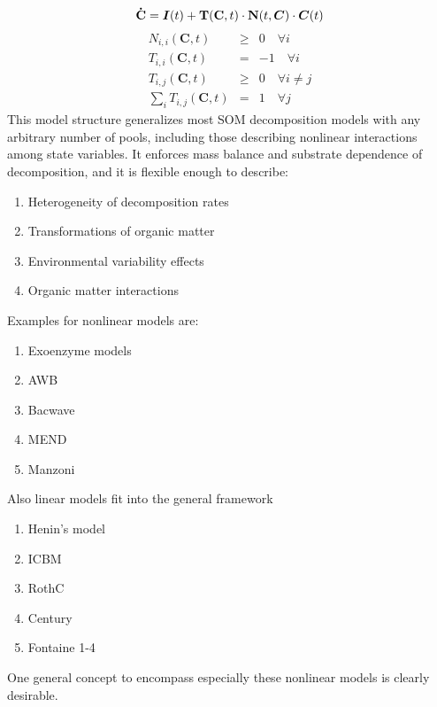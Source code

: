 
\begin{multicols}{2}
    		\[
		\mathbf{\dot{C}}= \bm{I}(t) + {\bf T}(\mathbf{C},t) \cdot {\bf N}(t, \bm{C}) \cdot \bm{C}(t)
    		\]
    		\begin{equation*}	
    		\label{structCond}
    		\begin{array}{lcl}	
    		N_{i,i}(\mathbf{C},t) 		&\ge& 	 0 \quad \forall i \\
    		T_{i,i}(\mathbf{C},t) 		&=& 	 -1 \quad \forall i \\
    		T_{i,j}(\mathbf{C},t) 		&\ge& 	 0 \quad \forall i \ne j \\
    		\sum_i T_{i,j}(\mathbf{C},t) 	&=  &	 1\quad \forall j 
    		\end{array}	
    		\end{equation*}	
    		This model structure generalizes most SOM decomposition models with any arbitrary number of pools, including those describing nonlinear interactions among state variables. It enforces mass balance and substrate dependence of decomposition, and it is flexible enough to describe:
		\begin{enumerate}
		\item Heterogeneity of decomposition rates
		\item Transformations of organic matter
		\item Environmental variability effects
		\item Organic matter interactions
		\end{enumerate}
    \columnbreak
		Examples for nonlinear models are:
		\begin{enumerate}
			\item Exoenzyme models \citep{Schimel,Sinsabaugh}
			\item AWB \citep{Allison}
			\item Bacwave \citep{Zelenev}
			\item MEND \citep{WangMEND}
			\item Manzoni \citep{Manzoni07}
		\end{enumerate}
		Also linear models fit into the general framework 
		\begin{enumerate}
			\item Henin's model \citep{HeninDupuis, Henin}
			\item ICBM \citep{AndrenKatterer}
			\item RothC \citep{Jenkinson, Coleman} 
			\item Century \citep{Parton} 
			\item Fontaine 1-4 \citep{Fontaine}
		\end{enumerate}
\end{multicols}
One general concept to encompass especially  these nonlinear  models is clearly desirable.
